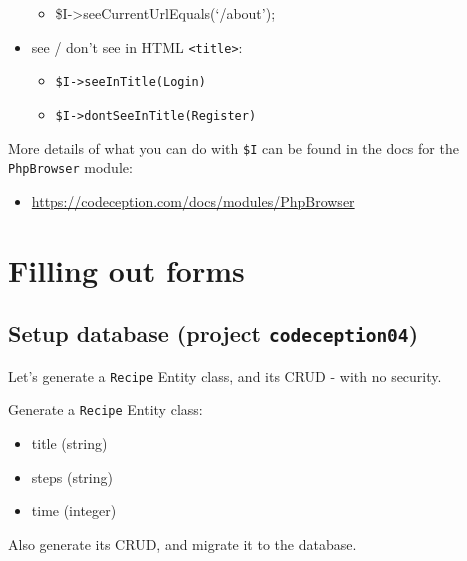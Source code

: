 \documentclass[a4paperpaper,openright]{book}
\providecommand{\tightlist}{%
  \setlength{\itemsep}{0pt}\setlength{\parskip}{0pt}}
\begin{document}
\begin{itemize}
  \begin{itemize}
  \tightlist
  \item
    \$I-\textgreater{}seeCurrentUrlEquals(`/about');
  \end{itemize}
\item
  see / don't see in HTML \texttt{\textless{}title\textgreater{}}:

  \begin{itemize}
  \item
    \texttt{\$I-\textgreater{}seeInTitle(\textquotesingle{}Login\textquotesingle{})}
  \item
    \texttt{\$I-\textgreater{}dontSeeInTitle(\textquotesingle{}Register\textquotesingle{})}
  \end{itemize}
\end{itemize}

More details of what you can do with \texttt{\$I} can be found in the
docs for the \texttt{PhpBrowser} module:

\begin{itemize}
\tightlist
\item
  \url{https://codeception.com/docs/modules/PhpBrowser}
\end{itemize}

\hypertarget{filling-out-forms}{%
\chapter{Filling out forms}\label{filling-out-forms}}

\hypertarget{setup-database-project-codeception04}{%
\section{\texorpdfstring{Setup database (project
\texttt{codeception04})}{Setup database (project codeception04)}}\label{setup-database-project-codeception04}}

Let's generate a \texttt{Recipe} Entity class, and its CRUD - with no
security.

Generate a \texttt{Recipe} Entity class:

\begin{itemize}
\item
  title (string)
\item
  steps (string)
\item
  time (integer)
\end{itemize}

Also generate its CRUD, and migrate it to the database.
\end{document}
